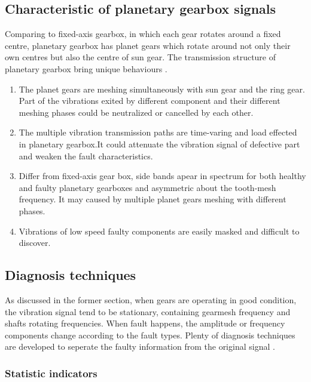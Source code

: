 \subsection{ Characteristic of planetary gearbox signals}

Comparing to fixed-axis gearbox, in which each gear rotates around a fixed centre, planetary gearbox has planet gears which rotate around not only their own centres but also the centre of sun gear. The transmission structure of planetary gearbox bring unique behaviours \cite{review}.
\begin{enumerate}
\item The planet gears are meshing simultaneously with sun gear and the ring gear. Part of the vibrations exited by different component and their different meshing phases could be neutralized or cancelled by each other.

\item The multiple vibration transmission paths are time-varing and load effected in planetary gearbox.It could attenuate the vibration signal of defective part and weaken the fault characteristics.

\item Differ from fixed-axis gear box, side bands apear in spectrum for both healthy and faulty planetary gearboxes and asymmetric about the tooth-mesh frequency. It may caused by multiple planet gears meshing with different phases.

\item Vibrations of low speed faulty components are easily masked and difficult to discover.
\end{enumerate}


\subsection{Diagnosis techniques}

As discussed in the former section, when gears are operating in good condition, the vibration signal tend to be stationary, containing gearmesh frequency and shafts rotating frequencies. When fault happens, the amplitude or frequency components change according to the fault types.
Plenty of diagnosis techniques are developed to seperate the faulty information from the original signal \cite{practical} .

\subsubsection{Statistic indicators}


